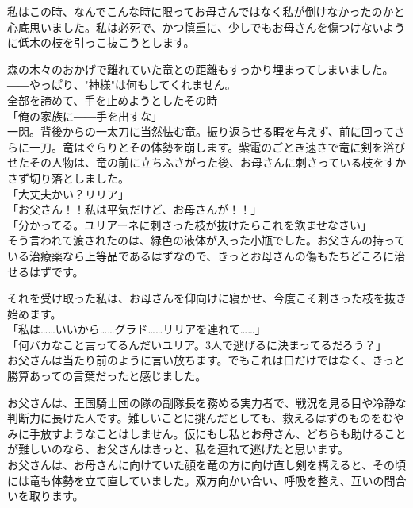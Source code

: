 \documentclass[oneside, a4paper]{jsbook}
\begin{document}
私はこの時、なんでこんな時に限ってお母さんではなく私が倒けなかったのかと心底思いました。私は必死で、かつ慎重に、少しでもお母さんを傷つけないように低木の枝を引っこ抜こうとします。

森の木々のおかげで離れていた竜との距離もすっかり埋まってしまいました。\\

――やっぱり、"神様"は何もしてくれません。\\

全部を諦めて、手を止めようとしたその時――\\

\noindent
「俺の家族に――手を出すな」\\

一閃。背後からの一太刀に当然怯む竜。振り返らせる暇を与えず、前に回ってさらに一刀。竜はぐらりとその体勢を崩します。紫電のごとき速さで竜に剣を浴びせたその人物は、竜の前に立ちふさがった後、お母さんに刺さっている枝をすかさず切り落としました。\\

\noindent
「大丈夫かい？リリア」\\
「お父さん！！私は平気だけど、お母さんが！！」\\
「分かってる。ユリアーネに刺さった枝が抜けたらこれを飲ませなさい」\\

そう言われて渡されたのは、緑色の液体が入った小瓶でした。お父さんの持っている治療薬なら上等品であるはずなので、きっとお母さんの傷もたちどころに治せるはずです。

それを受け取った私は、お母さんを仰向けに寝かせ、今度こそ刺さった枝を抜き始めます。\\

\noindent
「私は……いいから……グラド……リリアを連れて……」\\
「何バカなこと言ってるんだいユリア。3人で逃げるに決まってるだろう？」\\

お父さんは当たり前のように言い放ちます。でもこれは口だけではなく、きっと勝算あっての言葉だったと感じました。

お父さんは、王国騎士団の隊の副隊長を務める実力者で、戦況を見る目や冷静な判断力に長けた人です。難しいことに挑んだとしても、救えるはずのものをむやみに手放すようなことはしません。仮にもし私とお母さん、どちらも助けることが難しいのなら、お父さんはきっと、私を連れて逃げたと思います。\\

お父さんは、お母さんに向けていた顔を竜の方に向け直し剣を構えると、その頃には竜も体勢を立て直していました。双方向かい合い、呼吸を整え、互いの間合いを取ります。
\end{document}

